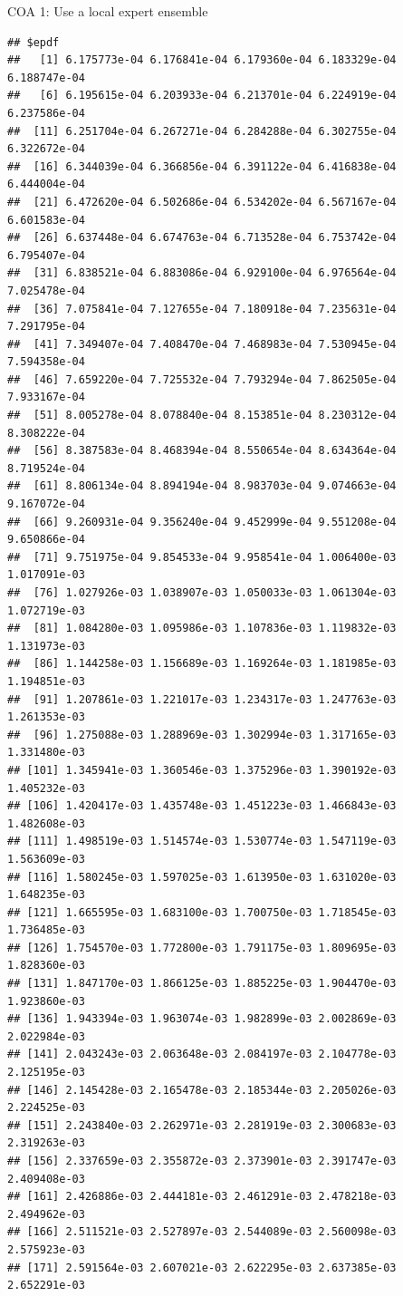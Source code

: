 \documentclass[ignorenonframetext,]{beamer}
\begin{document}
\begin{frame}[fragile]{COA 1: Use a local expert ensemble}
\begin{verbatim}
## $epdf
##   [1] 6.175773e-04 6.176841e-04 6.179360e-04 6.183329e-04 6.188747e-04
##   [6] 6.195615e-04 6.203933e-04 6.213701e-04 6.224919e-04 6.237586e-04
##  [11] 6.251704e-04 6.267271e-04 6.284288e-04 6.302755e-04 6.322672e-04
##  [16] 6.344039e-04 6.366856e-04 6.391122e-04 6.416838e-04 6.444004e-04
##  [21] 6.472620e-04 6.502686e-04 6.534202e-04 6.567167e-04 6.601583e-04
##  [26] 6.637448e-04 6.674763e-04 6.713528e-04 6.753742e-04 6.795407e-04
##  [31] 6.838521e-04 6.883086e-04 6.929100e-04 6.976564e-04 7.025478e-04
##  [36] 7.075841e-04 7.127655e-04 7.180918e-04 7.235631e-04 7.291795e-04
##  [41] 7.349407e-04 7.408470e-04 7.468983e-04 7.530945e-04 7.594358e-04
##  [46] 7.659220e-04 7.725532e-04 7.793294e-04 7.862505e-04 7.933167e-04
##  [51] 8.005278e-04 8.078840e-04 8.153851e-04 8.230312e-04 8.308222e-04
##  [56] 8.387583e-04 8.468394e-04 8.550654e-04 8.634364e-04 8.719524e-04
##  [61] 8.806134e-04 8.894194e-04 8.983703e-04 9.074663e-04 9.167072e-04
##  [66] 9.260931e-04 9.356240e-04 9.452999e-04 9.551208e-04 9.650866e-04
##  [71] 9.751975e-04 9.854533e-04 9.958541e-04 1.006400e-03 1.017091e-03
##  [76] 1.027926e-03 1.038907e-03 1.050033e-03 1.061304e-03 1.072719e-03
##  [81] 1.084280e-03 1.095986e-03 1.107836e-03 1.119832e-03 1.131973e-03
##  [86] 1.144258e-03 1.156689e-03 1.169264e-03 1.181985e-03 1.194851e-03
##  [91] 1.207861e-03 1.221017e-03 1.234317e-03 1.247763e-03 1.261353e-03
##  [96] 1.275088e-03 1.288969e-03 1.302994e-03 1.317165e-03 1.331480e-03
## [101] 1.345941e-03 1.360546e-03 1.375296e-03 1.390192e-03 1.405232e-03
## [106] 1.420417e-03 1.435748e-03 1.451223e-03 1.466843e-03 1.482608e-03
## [111] 1.498519e-03 1.514574e-03 1.530774e-03 1.547119e-03 1.563609e-03
## [116] 1.580245e-03 1.597025e-03 1.613950e-03 1.631020e-03 1.648235e-03
## [121] 1.665595e-03 1.683100e-03 1.700750e-03 1.718545e-03 1.736485e-03
## [126] 1.754570e-03 1.772800e-03 1.791175e-03 1.809695e-03 1.828360e-03
## [131] 1.847170e-03 1.866125e-03 1.885225e-03 1.904470e-03 1.923860e-03
## [136] 1.943394e-03 1.963074e-03 1.982899e-03 2.002869e-03 2.022984e-03
## [141] 2.043243e-03 2.063648e-03 2.084197e-03 2.104778e-03 2.125195e-03
## [146] 2.145428e-03 2.165478e-03 2.185344e-03 2.205026e-03 2.224525e-03
## [151] 2.243840e-03 2.262971e-03 2.281919e-03 2.300683e-03 2.319263e-03
## [156] 2.337659e-03 2.355872e-03 2.373901e-03 2.391747e-03 2.409408e-03
## [161] 2.426886e-03 2.444181e-03 2.461291e-03 2.478218e-03 2.494962e-03
## [166] 2.511521e-03 2.527897e-03 2.544089e-03 2.560098e-03 2.575923e-03
## [171] 2.591564e-03 2.607021e-03 2.622295e-03 2.637385e-03 2.652291e-03

\end{verbatim}
\end{frame}
\end{document}
